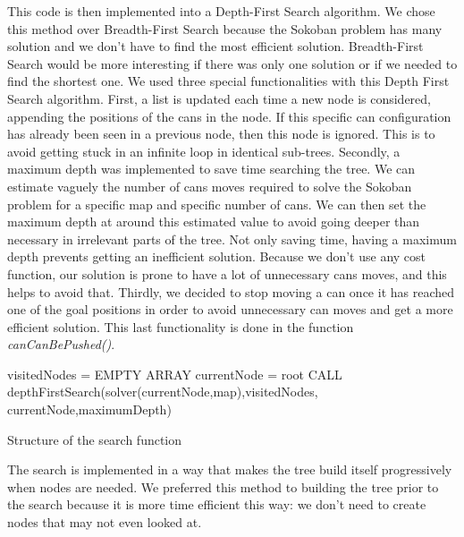 \documentclass[a4paper,12pt]{article}
\begin{document}
This code is then implemented into a Depth-First Search algorithm.
We chose this method over Breadth-First Search because the Sokoban problem has many solution and we don't have to find the most efficient solution. Breadth-First Search would be more interesting if there was only one solution or if we needed to find the shortest one.\newline
We used three special functionalities with this Depth First Search algorithm. First, a list is updated each time a new node is considered, appending the positions of the cans in the node. If this specific can configuration has already been seen in a previous node, then this node is ignored. This is to avoid getting stuck in an infinite loop in identical sub-trees. \newline
Secondly, a maximum depth was implemented to save time searching the tree. We can estimate vaguely the number of cans moves required to solve the Sokoban problem for a specific map and specific number of cans. We can then set the maximum depth at around this estimated value to avoid going deeper than necessary in irrelevant parts of the tree. Not only saving time, having a maximum depth prevents getting an inefficient solution. Because we don't use any cost function, our solution is prone to have a lot of unnecessary cans moves, and this helps to avoid that. Thirdly, we decided to stop moving a can once it has reached one of the goal positions in order to avoid unnecessary can moves and get a more efficient solution. This last functionality is done in the function \textit{canCanBePushed()}.




\begin{algorithm}[H]
 \SetAlgoLined
 visitedNodes = EMPTY ARRAY\; \newline
 currentNode = root\; \newline
  {
 CALL depthFirstSearch(solver(currentNode,map),visitedNodes,\; \newline
 currentNode,maximumDepth)\;
 }
\caption{Structure of the search function}
\end{algorithm}


The search is implemented in a way that makes the tree build itself progressively when nodes are needed. We preferred this method to building the tree prior to the search because it is more time efficient this way: we don't need to create nodes that may not even looked at.
\pagebreak[4]
\end{document}
